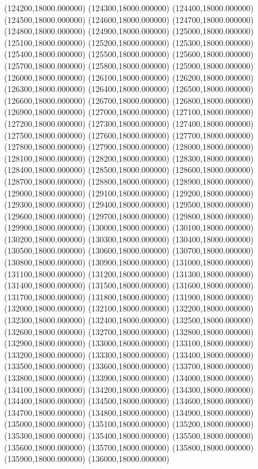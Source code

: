 (124200,18000.000000)
(124300,18000.000000)
(124400,18000.000000)
(124500,18000.000000)
(124600,18000.000000)
(124700,18000.000000)
(124800,18000.000000)
(124900,18000.000000)
(125000,18000.000000)
(125100,18000.000000)
(125200,18000.000000)
(125300,18000.000000)
(125400,18000.000000)
(125500,18000.000000)
(125600,18000.000000)
(125700,18000.000000)
(125800,18000.000000)
(125900,18000.000000)
(126000,18000.000000)
(126100,18000.000000)
(126200,18000.000000)
(126300,18000.000000)
(126400,18000.000000)
(126500,18000.000000)
(126600,18000.000000)
(126700,18000.000000)
(126800,18000.000000)
(126900,18000.000000)
(127000,18000.000000)
(127100,18000.000000)
(127200,18000.000000)
(127300,18000.000000)
(127400,18000.000000)
(127500,18000.000000)
(127600,18000.000000)
(127700,18000.000000)
(127800,18000.000000)
(127900,18000.000000)
(128000,18000.000000)
(128100,18000.000000)
(128200,18000.000000)
(128300,18000.000000)
(128400,18000.000000)
(128500,18000.000000)
(128600,18000.000000)
(128700,18000.000000)
(128800,18000.000000)
(128900,18000.000000)
(129000,18000.000000)
(129100,18000.000000)
(129200,18000.000000)
(129300,18000.000000)
(129400,18000.000000)
(129500,18000.000000)
(129600,18000.000000)
(129700,18000.000000)
(129800,18000.000000)
(129900,18000.000000)
(130000,18000.000000)
(130100,18000.000000)
(130200,18000.000000)
(130300,18000.000000)
(130400,18000.000000)
(130500,18000.000000)
(130600,18000.000000)
(130700,18000.000000)
(130800,18000.000000)
(130900,18000.000000)
(131000,18000.000000)
(131100,18000.000000)
(131200,18000.000000)
(131300,18000.000000)
(131400,18000.000000)
(131500,18000.000000)
(131600,18000.000000)
(131700,18000.000000)
(131800,18000.000000)
(131900,18000.000000)
(132000,18000.000000)
(132100,18000.000000)
(132200,18000.000000)
(132300,18000.000000)
(132400,18000.000000)
(132500,18000.000000)
(132600,18000.000000)
(132700,18000.000000)
(132800,18000.000000)
(132900,18000.000000)
(133000,18000.000000)
(133100,18000.000000)
(133200,18000.000000)
(133300,18000.000000)
(133400,18000.000000)
(133500,18000.000000)
(133600,18000.000000)
(133700,18000.000000)
(133800,18000.000000)
(133900,18000.000000)
(134000,18000.000000)
(134100,18000.000000)
(134200,18000.000000)
(134300,18000.000000)
(134400,18000.000000)
(134500,18000.000000)
(134600,18000.000000)
(134700,18000.000000)
(134800,18000.000000)
(134900,18000.000000)
(135000,18000.000000)
(135100,18000.000000)
(135200,18000.000000)
(135300,18000.000000)
(135400,18000.000000)
(135500,18000.000000)
(135600,18000.000000)
(135700,18000.000000)
(135800,18000.000000)
(135900,18000.000000)
(136000,18000.000000)
